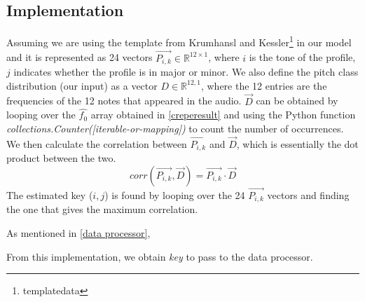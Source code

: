 \subsection{Implementation}
Assuming we are using the template from Krumhansl and Kessler\footnote{templatedata} in our model and it is represented as 24 vectors $\vec{P_{i,k}} \in \mathbb{R}^{12 \times 1}$, 
where $i$ is the tone of the profile, $j$ indicates whether the profile is in major or minor.
We also define the pitch class distribution (our input) as a vector $D \in \mathbb{R}^{12,1}$, where the 12 entries are the frequencies of the 12 notes that appeared in the audio.
$\vec{D}$ can be obtained by looping over the $\hat{f_0}$ array obtained in \cref{creperesult} and using the Python function \emph{collections.Counter([iterable-or-mapping])} to count the
number of occurrences. We then calculate the correlation between $\vec{P_{i,k}}$ and $\vec{D}$, which is essentially the dot product between the two.
\[ corr(\vec{P_{i,k}},\vec{D}) = \vec{P_{i,k}} \cdot \vec{D} \]
The estimated key ($i,j$) is found by looping over the 24 $\vec{P_{i,k}}$ vectors and finding the one that gives the maximum correlation.

As mentioned in \cref{data processor}, 




From this implementation, we obtain \emph{key} to pass to the data processor.
